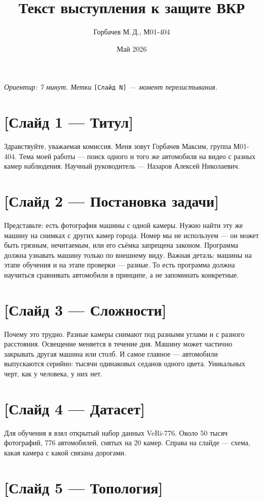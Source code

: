 \documentclass[a4paper,12pt]{article}
\title{Текст выступления к защите ВКР}
\author{Горбачев М.\,Д., М01-404}
\date{Май 2026}
\begin{document}
\maketitle

\textit{Ориентир: 7 минут. Метки }\texttt{[Слайд N]}\textit{ — момент перелистывания.}

\section*{[Слайд 1 — Титул]}

Здравствуйте, уважаемая комиссия. Меня зовут Горбачев Максим, группа М01-404. Тема моей работы — поиск одного и того же автомобиля на видео с разных камер наблюдения. Научный руководитель — Назаров Алексей Николаевич.

\section*{[Слайд 2 — Постановка задачи]}

Представьте: есть фотография машины с одной камеры. Нужно найти эту же машину на снимках с других камер города. Номер мы не используем — он может быть грязным, нечитаемым, или его съёмка запрещена законом. Программа должна узнавать машину только по внешнему виду. Важная деталь: машины на этапе обучения и на этапе проверки — разные. То есть программа должна научиться сравнивать автомобили в принципе, а не запоминать конкретные.

\section*{[Слайд 3 — Сложности]}

Почему это трудно. Разные камеры снимают под разными углами и с разного расстояния. Освещение меняется в течение дня. Машину может частично закрывать другая машина или столб. И самое главное — автомобили выпускаются серийно: тысячи одинаковых седанов одного цвета. Уникальных черт, как у человека, у них нет.

\section*{[Слайд 4 — Датасет]}

Для обучения я взял открытый набор данных VeRi-776. Около 50 тысяч фотографий, 776 автомобилей, снятых на 20 камер. Справа на слайде — схема, какая камера с какой связана дорогами.

\section*{[Слайд 5 — Топология]}
\end{document}
